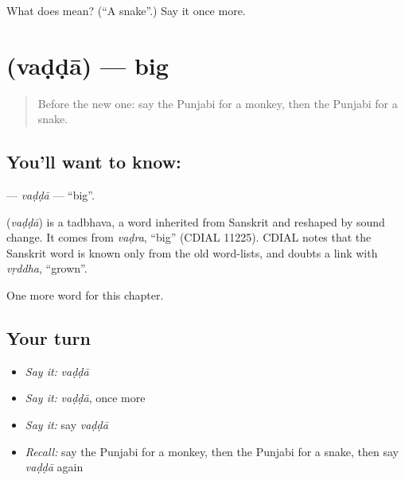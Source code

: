 \begin{tcolorbox}[breakable,colback=teal!4,colframe=teal!35!black,title={Before you move on}]
What does  mean? (\textquotedblleft{}A snake\textquotedblright{}.) Say it once more.
\end{tcolorbox}
\section[\texorpdfstring{\pa{ਵੱਡਾ} (vaḍḍā)}{ਵੱਡਾ (vaḍḍā)}]{ (vaḍḍā) — big}

\label{lesson:PA-C79-vadda}



\begin{quote}
Before the new one: say the Punjabi for a monkey, then the Punjabi for a snake.
\end{quote}

\subsection*{You'll want to know: }
\textbf{} — \emph{vaḍḍā} — \textquotedblleft{}big\textquotedblright{}.

\begin{cousinweb}
\textbf{} (\emph{vaḍḍā}) is a tadbhava, a word inherited from Sanskrit and reshaped by sound change. It comes from \emph{vaḍra}, \textquotedblleft{}big\textquotedblright{} (CDIAL 11225). CDIAL notes that the Sanskrit word is known only from the old word-lists, and doubts a link with \emph{vṛddha}, \textquotedblleft{}grown\textquotedblright{}.
\end{cousinweb}

\begin{grammarlens}[title={What you've built}]
One more word for this chapter.
\end{grammarlens}

\subsection*{Your turn}
\begin{itemize}
\raggedright
  \item \emph{Say it:} \emph{vaḍḍā}
  \item \emph{Say it:} \emph{vaḍḍā}, once more
  \item \emph{Say it:} say \emph{vaḍḍā}
  \item \emph{Recall:} say the Punjabi for a monkey, then the Punjabi for a snake, then say \emph{vaḍḍā} again
\end{itemize}

